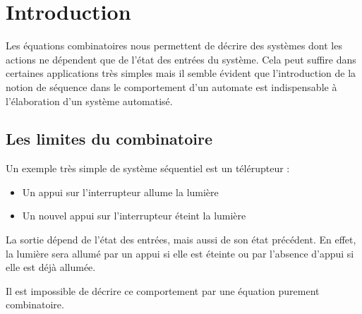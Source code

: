 \documentclass[11pt]{article}
\begin{document}
\UPSTIbuildPage


\tableofcontents

\section{Introduction}
Les équations combinatoires nous permettent de décrire des systèmes dont les actions ne dépendent que de l'état des entrées du système. Cela peut suffire dans certaines applications très simples mais il semble évident que l'introduction de la notion de séquence dans le comportement d'un automate est indispensable à l'élaboration d'un système automatisé. 

\subsection{Les limites du combinatoire}
Un exemple très simple de système séquentiel est un télérupteur : 
\begin{itemize}
	\item Un appui sur l'interrupteur allume la lumière
	\item Un nouvel appui sur l'interrupteur éteint la lumière
\end{itemize}

La sortie dépend de l'état des entrées, mais aussi de son état précédent. En effet, la lumière sera allumé par un appui si elle est éteinte ou par l'absence d'appui si elle est déjà allumée. 

Il est impossible de décrire ce comportement par une équation purement combinatoire.
\pagebreak
\end{document}
